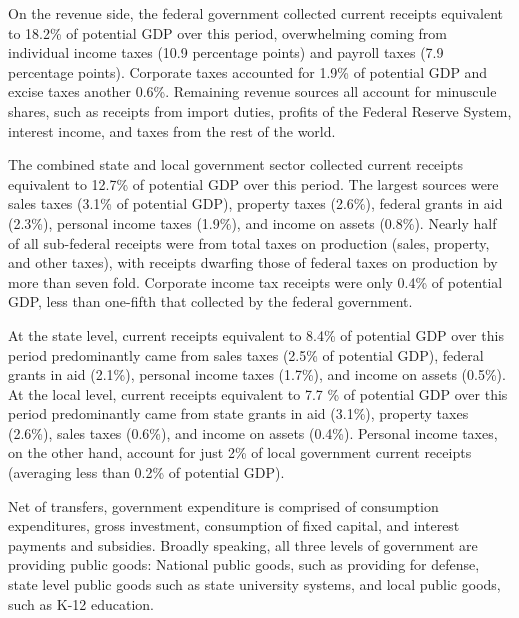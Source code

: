 \documentclass[12pt,letterpaper]{article}
\begin{document}
On the revenue side, the federal government collected current receipts equivalent to 18.2\% of potential GDP over this period, overwhelming coming from individual income taxes (10.9 percentage points) and payroll taxes (7.9 percentage points). Corporate taxes accounted for 1.9\% of potential GDP and excise taxes another 0.6\%. Remaining revenue sources all account for minuscule shares, such as receipts from import duties, profits of the Federal Reserve System, interest income, and taxes from the rest of the world.

The combined state and local government sector collected current receipts equivalent to 12.7\% of potential GDP over this period. The largest sources were sales taxes (3.1\% of potential GDP), property taxes (2.6\%), federal grants in aid (2.3\%), personal income taxes (1.9\%), and income on assets (0.8\%). Nearly half of all sub-federal receipts were from total taxes on production (sales, property, and other taxes), with receipts dwarfing those of federal taxes on production by more than seven fold. Corporate income tax receipts were only 0.4\% of potential GDP, less than one-fifth that collected by the federal government. 

At the state level, current receipts equivalent to 8.4\% of potential GDP over this period predominantly came from sales taxes (2.5\% of potential GDP), federal grants in aid (2.1\%), personal income taxes (1.7\%), and income on assets (0.5\%). At the local level, current receipts equivalent to 7.7 \% of potential GDP over this period predominantly came from state grants in aid (3.1\%), property taxes (2.6\%), sales taxes (0.6\%), and income on assets (0.4\%). Personal income taxes, on the other hand, account for just 2\% of local government current receipts (averaging less than 0.2\% of potential GDP).

Net of transfers, government expenditure is comprised of consumption expenditures, gross investment, consumption of fixed capital, and interest payments and subsidies. Broadly speaking, all three levels of government are providing public goods: National public goods, such as providing for defense, state level public goods such as state university systems, and local public goods, such as K-12 education.
\end{document}
